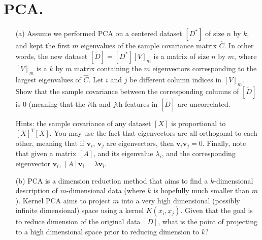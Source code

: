 \documentclass[11pt]{article}
\renewcommand{\vec}[1]{\mathbf{#1}}
\begin{document}
\begin{answertext}{12cm}{}
\end{answertext} 

\pagebreak

\section*{PCA.}

\begin{enumerate}
\item[(a)] Assume we performed PCA on a centered dataset $[D^*]$ of size $n$ by $k$, and kept the first $m$ eigenvalues of the sample covariance matrix $\hat{C}$.
In other words, the new dataset $[\tilde{D}] = [D^*] [V]_m$ is a matrix of size $n$ by $m$, where $[V]_m$ is a $k$ by $m$ matrix containing the $m$ eigenvectors corresponding to the largest eigenvalues
of $\hat{C}$.  Let $i$ and $j$ be different column indices in $[V]_m$.  Show that the sample covariance between the corresponding columns of $[\tilde{D}]$ is $0$ (meaning that the $i$th and $j$th features in $[\tilde{D}]$ are uncorrelated.

Hints: the sample covariance of any dataset $[X]$ is proportional to $[X]^T [X]$.  You may use the fact that eigenvectors are all orthogonal to each other, meaning that if $\vec{v}_i$, $\vec{v}_j$ are eigenvectors, then $\vec{v}_i \vec{v}_j = 0$.  Finally, note that given a matrix $[A]$, and its eigenvalue $\lambda_i$, and the corresponding eigenvector $\vec{v}_i$, $[A] \vec{v}_i = \lambda \vec{v}_i$.

\item[(b)] PCA is a dimension reduction method that aims to find a $k$-dimensional description of $m$-dimensional data (where $k$ is hopefully much smaller than $m$).
Kernel PCA aims to project $m$ into a very high dimensional (possibly infinite dimensional) space using a kernel $K(x_i,x_j)$.  Given that the goal is to reduce dimension of the
original data $[D]$, what is the point of projecting to a high dimensional space prior to reducing dimension to $k$?

\end{enumerate}

\begin{answertext}{12cm}{}
\end{answertext}

\pagebreak

\end{document}
